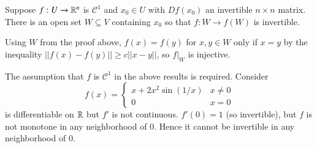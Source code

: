 \begin{corollary}
    Suppose $f:U\rightarrow \mathbb R^n$ is $\mathcal{C}^1$ and $x_0 \in U$ with $Df(x_0)$ an invertible $n\times n$ matrix. There is an open set $W \subseteq V$ containing $x_0$ so that $f:W\rightarrow f(W)$ is invertible.
\end{corollary}

Using $W$ from the proof above, $f(x) = f(y)$ for $x,y \in W$ only if $x = y$ by the inequality $||f(x) - f(y)|| \geq c||x-y||$, so $f\vert_W$ is injective.

\begin{example}
    The assumption that $f$ is $\mathcal{C}^1$ in the above results is required. Consider $$f(x) = \left\{\begin{array}{cc} x+2x^2\sin(1/x) & x \neq 0 \\ 0 & x = 0\end{array}\right.$$ is differentiable on $\mathbb R$ but $f'$ is not continuous. $f'(0) = 1$ (so invertible), but $f$ is not monotone in any neighborhood of $0$. Hence it cannot be invertible in any neighborhood of $0$.
\end{example}

